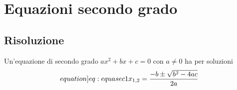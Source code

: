 \chapter{Equazioni secondo grado}\label{ch:equazioni-secondo-grado}
\section{Risoluzione}\label{sec:risoluzione}
\begin{thm}\label{thm:Equasec1}
	Un'equazione di secondo grado $ax^2+bx+c=0$ con $a\neq 0$ ha per soluzioni \begin{equation*}\label[equation]{eq:equasec1}
	x_{1,2}=\dfrac{-b\pm\sqrt{b^2-4ac}}{2a}
	\end{equation*}
\end{thm}
